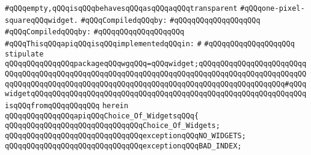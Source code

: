 \verb|#qQQqempty,qQQqisqQQqbehavesqQQqasqQQqaqQQqtransparent|\newline
\verb|#qQQqone-pixel-squareqQQqwidget.|\newline
\newline
\verb|#qQQqCompiledqQQqby:|\newline
\verb|#qQQqqQQqqQQqqQQqqQQq|\newline
\newline
\newline
\verb|#qQQqCompiledqQQqby:|\newline
\verb|#qQQqqQQqqQQqqQQqqQQq|\newline
\newline
\newline
\newline
\newline
\verb|#qQQqThisqQQqapiqQQqisqQQqimplementedqQQqin:|\newline
\verb|#|\newline
\verb|#qQQqqQQqqQQqqQQqqQQq|\newline
\newline
\verb|stipulate|\newline
\verb|qQQqqQQqqQQqqQQqpackageqQQqwgqQQq=qQQqwidget;qQQqqQQqqQQqqQQqqQQqqQQqqQQqqQQqqQQqqQQqqQQqqQQqqQQqqQQqqQQqqQQqqQQqqQQqqQQqqQQqqQQqqQQqqQQqqQQqqQQqqQQqqQQqqQQqqQQqqQQqqQQqqQQqqQQqqQQqqQQqqQQqqQQqqQQqqQQqqQQq#qQQqwidgetqQQqqQQqqQQqqQQqqQQqqQQqqQQqqQQqqQQqqQQqqQQqqQQqqQQqqQQqqQQqqQQqisqQQqfromqQQqqQQqqQQq|\newline
\verb|herein|\newline
\newline
\verb|qQQqqQQqqQQqqQQqapiqQQqChoice_Of_WidgetsqQQq{|\newline
\newline
\verb|qQQqqQQqqQQqqQQqqQQqqQQqqQQqqQQqChoice_Of_Widgets;|\newline
\newline
\verb|qQQqqQQqqQQqqQQqqQQqqQQqqQQqqQQqexceptionqQQqNO_WIDGETS;|\newline
\verb|qQQqqQQqqQQqqQQqqQQqqQQqqQQqqQQqexceptionqQQqBAD_INDEX;|\newline

